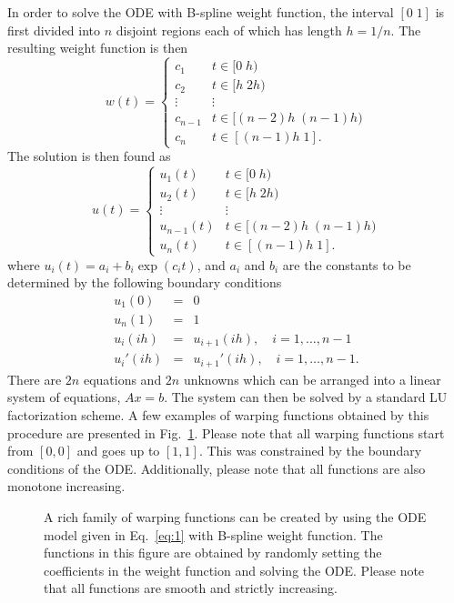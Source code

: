 \documentclass[number,1p,12pt]{elsarticle}
\begin{document}
In order to solve the ODE with B-spline weight function, the interval $[0\;1]$ is first divided into $n$ disjoint regions each of which has length $h=1/n$. The resulting weight function is then
\begin{equation}
w(t) = \left\{
\begin{array}{ll}
 c_1 & t\in [0\;h)\\
 c_2 & t\in [h\;2h)\\
 \vdots & \vdots \\
 c_{n-1} & t\in [(n-2)h\;(n-1)h)\\
 c_n & t\in [(n-1)h\;1].
\end{array}
\right. \label{eq:5} 
\end{equation}
The solution is then found as
\begin{equation}
u(t)  =  \left\{
\begin{array}{ll}
 u_1(t) & t\in [0\;h)\\
 u_2(t) & t\in [h\;2h)\\
 \vdots & \vdots \\
 u_{n-1}(t) & t\in [(n-2)h\;(n-1)h)\\
 u_n(t) & t\in [(n-1)h\;1].
\end{array}
\right.
\end{equation}
where $u_i(t) =  a_i + b_i\exp({c_it})$, and $a_i$ and $b_i$ are the constants to be determined by the following boundary conditions 
\begin{eqnarray}
 u_1(0)          & = & 0 \\
 u_n(1)          & = & 1 \\
 u_i(ih)  & = & u_{i+1}(ih),\quad i=1,\ldots,n-1 \\
 u_i'(ih)  & = & u_{i+1}'(ih),\quad i=1,\ldots,n-1 .
\end{eqnarray}
There are $2n$ equations and $2n$ unknowns which can be arranged into a linear system of equations, $Ax=b$. The system can then be solved by a standard LU factorization scheme. A few examples of warping functions obtained by this procedure are presented in Fig.~\ref{Figure02}. Please note that all warping functions start from $[0,0]$ and goes up to $[1,1]$. This was constrained by the boundary conditions of the ODE. Additionally, please note that all functions are also monotone increasing. 

\begin{figure}
\caption{A rich family of warping functions can be created by using the ODE model given in Eq.~\ref{eq:1} with B-spline weight function. The functions in this figure are obtained by randomly setting the coefficients in the weight function and solving the ODE. Please note that all functions are smooth and strictly increasing.}
\label{Figure02}
\end{figure} 
\end{document}
